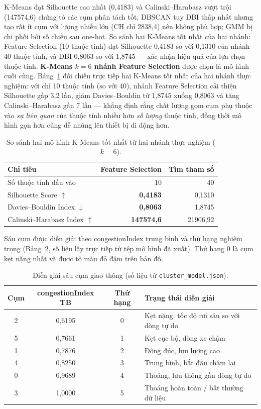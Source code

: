 K-Means đạt Silhouette cao nhất (0{,}4183) và Calinski--Harabasz vượt trội (147574{,}6) chứng tỏ các cụm phân tách tốt; DBSCAN tuy DBI thấp nhất nhưng tạo rất ít cụm với lượng nhiễu lớn (CH chỉ 2838{,}4) nên không phù hợp; GMM bị chi phối bởi số chiều sau one-hot. So sánh hai K-Means tốt nhất của hai nhánh: Feature Selection (10 thuộc tính) đạt Silhouette 0{,}4183 so với 0{,}1310 của nhánh 40 thuộc tính, và DBI 0{,}8063 so với 1{,}8745 --- xác nhận hiệu quả của lựa chọn thuộc tính. \textbf{K-Means $k=6$ nhánh Feature Selection} được chọn là mô hình cuối cùng. Bảng~\ref{tab:twobranch} đối chiếu trực tiếp hai K-Means tốt nhất của hai nhánh thực nghiệm: với chỉ 10 thuộc tính (so với 40), nhánh Feature Selection cải thiện Silhouette gấp 3,2 lần, giảm Davies--Bouldin từ 1{,}8745 xuống 0{,}8063 và tăng Calinski--Harabasz gần 7 lần --- khẳng định rằng chất lượng gom cụm phụ thuộc vào \textit{sự liên quan} của thuộc tính nhiều hơn \textit{số lượng} thuộc tính, đồng thời mô hình gọn hơn cũng dễ nhúng lên thiết bị di động hơn.

\begin{table}[h!]
\centering
\caption{So sánh hai mô hình K-Means tốt nhất từ hai nhánh thực nghiệm ($k=6$).}
\label{tab:twobranch}
\small
\begin{tabular}{lrr}
\toprule
\textbf{Chỉ tiêu} & \textbf{Feature Selection} & \textbf{Tìm tham số}\\
\midrule
Số thuộc tính đầu vào & 10 & 40\\
Silhouette Score $\uparrow$ & \textbf{0{,}4183} & 0{,}1310\\
Davies--Bouldin Index $\downarrow$ & \textbf{0{,}8063} & 1{,}8745\\
Calinski--Harabasz Index $\uparrow$ & \textbf{147574{,}6} & 21906{,}92\\
\bottomrule
\end{tabular}
\end{table}

Sáu cụm được diễn giải theo congestionIndex trung bình và thứ hạng nghiêm trọng (Bảng~\ref{tab:profile}, số liệu lấy trực tiếp từ tệp mô hình đã xuất). Thứ hạng 0 là cụm kẹt nặng nhất và được tô màu đỏ đậm trên bản đồ.

\begin{table}[h!]
\centering
\caption{Diễn giải sáu cụm giao thông (số liệu từ \texttt{cluster\_model.json}).}
\label{tab:profile}
\small
\begin{tabular}{cccl}
\toprule
\textbf{Cụm} & \textbf{congestionIndex TB} & \textbf{Thứ hạng} & \textbf{Trạng thái diễn giải}\\
\midrule
2 & 0{,}6195 & 0 & Kẹt nặng: tốc độ rơi sâu so với dòng tự do\\
5 & 0{,}7661 & 1 & Kẹt cục bộ, dòng xe chậm\\
1 & 0{,}7876 & 2 & Đông đúc, lưu lượng cao\\
4 & 0{,}8250 & 3 & Trung bình, bắt đầu chậm lại\\
0 & 0{,}9689 & 4 & Thoáng, lưu thông gần dòng tự do\\
3 & 1{,}0000 & 5 & Thoáng hoàn toàn / bất thường dữ liệu\\
\bottomrule
\end{tabular}
\end{table}

